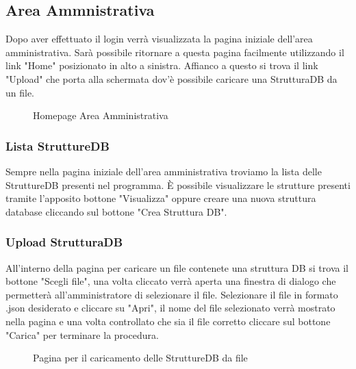\documentclass[5pt]{article}
\begin{document}
	    \subsection{Area Ammnistrativa}
	    Dopo aver effettuato il login verrà visualizzata la pagina iniziale dell'area amministrativa. Sarà possibile ritornare a questa pagina facilmente utilizzando il link "Home" posizionato in alto a sinistra. Affianco a questo si trova il link "Upload" che porta alla schermata dov'è possibile caricare una StrutturaDB da un file.
	    \begin{figure}[ht]
	    	\centering
	    	\caption{Homepage Area Amministrativa}
	    \end{figure}
	    
	    \subsubsection{Lista StruttureDB}
	    Sempre nella pagina iniziale dell'area amministrativa troviamo la lista delle StruttureDB presenti nel programma. È possibile visualizzare le strutture presenti tramite l'apposito bottone "Visualizza" oppure creare una nuova struttura database cliccando sul bottone "Crea Struttura DB". 
	    
	    \subsubsection{Upload StrutturaDB}
	    All'interno della pagina per caricare un file contenete una struttura DB si trova il bottone "Scegli file", una volta cliccato verrà aperta una finestra di dialogo che permetterà all'amministratore di selezionare il file. Selezionare il file in formato .json desiderato e cliccare su "Apri", il nome del file selezionato verrà mostrato nella pagina e una volta controllato che sia il file corretto cliccare sul bottone "Carica" per terminare la procedura.
	    \begin{figure}[h]
	    	\centering
	    	\caption{Pagina per il caricamento delle StruttureDB da file}
	    \end{figure}
	    
\end{document}
